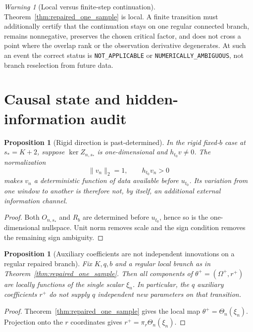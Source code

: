 \documentclass[11pt]{amsart}
\numberwithin{equation}{section}
\theoremstyle{plain}
\newtheorem{proposition}[theorem]{Proposition}
\theoremstyle{definition}
\theoremstyle{remark}
\newtheorem{warning}[theorem]{Warning}
\begin{document}
\begin{warning}[Local versus finite-step continuation]
\label{warn:repaired_local_only}
Theorem~\ref{thm:repaired_one_sample} is local. A finite transition must additionally certify that the continuation stays on one regular connected branch, remains nonnegative, preserves the chosen critical factor, and does not cross a point where the overlap rank or the observation derivative degenerates. At such an event the correct status is \texttt{NOT\_APPLICABLE} or \texttt{NUMERICALLY\_AMBIGUOUS}, not branch reselection from future data.
\end{warning}

\section{Causal state and hidden-information audit}
\label{sec:hidden_information}

\begin{proposition}[Rigid direction is past-determined]
\label{prop:rigid_direction_past}
In the rigid fixed-$b$ case at $s_*=K+2$, suppose $\ker Z_{n,s_*}$ is one-dimensional and $h_{t_0}v\neq0$. The normalization
\begin{equation}\|v_n\|_2=1,\qquad h_{t_0}v_n>0\label{eq:canonical_v_normalization}\end{equation}
makes $v_n$ a deterministic function of data available before $u_{t_0}$. Its variation from one window to another is therefore not, by itself, an additional external information channel.
\end{proposition}

\begin{proof}
Both $O_{n,s_*}$ and $R_b$ are determined before $u_{t_0}$, hence so is the one-dimensional nullspace. Unit norm removes scale and the sign condition removes the remaining sign ambiguity.
\end{proof}

\begin{proposition}[Auxiliary coefficients are not independent innovations on a regular repaired branch]
\label{prop:aux_not_independent}
Fix $K,q,b$ and a regular local branch as in Theorem~\ref{thm:repaired_one_sample}. Then all components of $\theta^+=(\Omega^+,r^+)$ are locally functions of the single scalar $\xi_n$. In particular, the $q$ auxiliary coefficients $r^+$ do not supply $q$ independent new parameters on that transition.
\end{proposition}

\begin{proof}
Theorem~\ref{thm:repaired_one_sample} gives the local map $\theta^+=\Theta_n(\xi_n)$. Projection onto the $r$ coordinates gives $r^+=\pi_r\Theta_n(\xi_n)$.
\end{proof}
\end{document}
